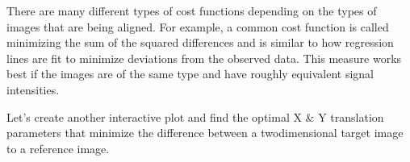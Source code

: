\documentclass[letterpaper,10pt,english]{sphinxmanual}
\begin{document}
There are many different types of cost functions depending on the types of images that are being aligned. For example, a common cost function is called minimizing the sum of the squared differences and is similar to how regression lines are fit to minimize deviations from the observed data. This measure works best if the images are of the same type and have roughly equivalent signal intensities.

Let’s create another interactive plot and find the optimal X \& Y translation parameters that minimize the difference between a two\sphinxhyphen{}dimensional target image to a reference image.

\begin{sphinxVerbatim}[commandchars=\\\{\}]
  
      
      
        
            
                            
      
      


\end{sphinxVerbatim}
\end{document}
